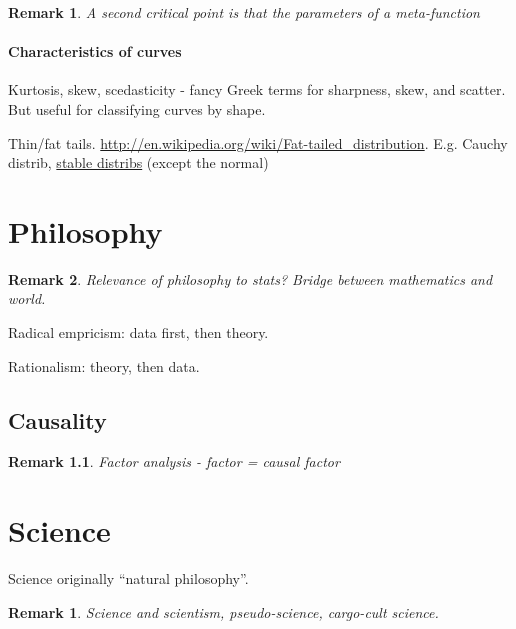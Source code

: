 \documentclass[reqno,12pt]{tufte-book}
\numberwithin{equation}{subsection}
\newtheorem{remark}{Remark}
\begin{document}
\begin{remark}
  A second critical point is that the parameters of a meta-function
\end{remark}

\subsection{Characteristics of curves}

Kurtosis, skew, scedasticity - fancy Greek terms for sharpness, skew,
and scatter.  But useful for classifying curves by shape.

Thin/fat tails.
\url{http://en.wikipedia.org/wiki/Fat-tailed_distribution}.
E.g. Cauchy distrib,
\href{http://en.wikipedia.org/wiki/Stable_distributions}{stable
  distribs} (except the normal)

\part{Philosophy}

\begin{remark}
  Relevance of philosophy to stats?  Bridge between mathematics and world.
\end{remark}

Radical empricism: data first, then theory.

Rationalism: theory, then data.

\chapter{Causality}

\begin{remark}
  Factor analysis - factor = causal factor
\end{remark}

\part{Science}

Science originally ``natural philosophy''.

\begin{remark}
  Science and scientism, pseudo-science, cargo-cult science.
\end{remark}
\end{document}

